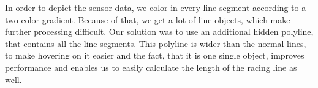 In order to depict the sensor data, we color in every line segment according to a two-color gradient. Because of that, we get a lot of line objects, which make further processing difficult. Our solution was to use an additional hidden polyline, that contains all the line segments. This polyline is wider than the normal lines, to make hovering on it easier and the fact, that it is one single object, improves performance and enables us to easily calculate the length of the racing line as well.

\clearpage